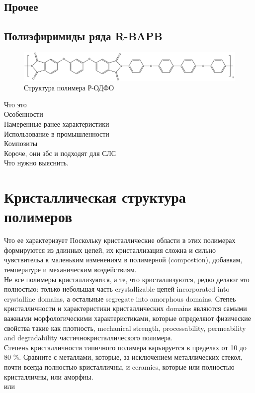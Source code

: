 \subsection{Прочее}


\subsection{Полиэфиримиды ряда R-BAPB }
		
	\begin{figure}[h]
	\includegraphics[width=\textwidth]{fig/formula.png}
	\caption{Структура полимера Р-ОДФО \cite{pi-formula}}
	\label{fig:formula}
	\end{figure}

Что это\\
Особенности\\
Намеренные ранее характеристики\\
Использование в промышленности\\
Композиты\\
Короче, они збс и подходят для СЛС\\
Что нужно выяснить.\\

\section{Кристаллическая структура полимеров}

Что ее характеризует
Поскольку кристаллические области в этих полимерах формируются из длинных цепей, их кристаллизация сложна и сильно чувствительа к маленьким изменениям в полимерной (compostion), добавкам, температуре и механическим воздействиям.\\
Не все полимеры кристаллизуются, а те, что кристаллизуются, редко делают это полностью: только небольшая часть crystallizable цепей incorporated into crystalline domains, а остальные segregate into amorphous domains. Степеь кристалличности и характеристики кристаллических domains являются самыми важными морфологическими характеристиками, которые определяют физические свойства такие как плотность, mechanical strength, processability, permeability and degradability частичнокристаллического полимера.\\
Степень кристалличности типичного полимера варьируется в пределах от 10 до 80 \%. Сравните с металлами, которые, за исключением металлических стекол, почти всегда полностью кристалличны, и ceramics, которые или полностью кристалличны, или аморфны.\\ \cite{cryst3} или \cite{cryst1}






